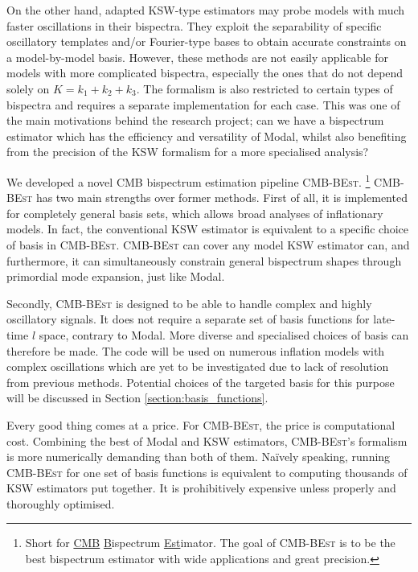 On the other hand, adapted KSW-type estimators \cite{Munchmeyer2014,Munchmeyer2015resonance,Meerburg2016jointResonance} may probe models with much faster oscillations in their bispectra. They exploit the separability of specific oscillatory templates and/or Fourier-type bases to obtain accurate constraints on a model-by-model basis. However, these methods are not easily applicable for models with more complicated bispectra, especially the ones that do not depend solely on $K=k_1+k_2+k_3$. The formalism is also restricted to certain types of bispectra and requires a separate implementation for each case. This was one of the main motivations behind the research project; can we have a bispectrum estimator which has the efficiency and versatility of Modal, whilst also benefiting from the precision of the KSW formalism for a more specialised analysis?

We developed a novel CMB bispectrum estimation pipeline \textsc{CMB-BEst}. \footnote{Short for \underline{CMB} \underline{B}ispectrum \underline{Est}imator. The goal of \textsc{CMB-BEst} is to be the best bispectrum estimator with wide applications and great precision.} \textsc{CMB-BEst} has two main strengths over former methods. First of all, it is implemented for completely general basis sets, which allows broad analyses of inflationary models. In fact, the conventional KSW estimator is equivalent to a specific choice of basis in \textsc{CMB-BEst}. \textsc{CMB-BEst} can cover any model KSW estimator can, and furthermore, it can simultaneously constrain general bispectrum shapes through primordial mode expansion, just like Modal.

Secondly, \textsc{CMB-BEst} is designed to be able to handle complex and highly oscillatory signals. It does not require a separate set of basis functions for late-time $l$ space, contrary to Modal. More diverse and specialised choices of basis can therefore be made. The code will be used on numerous inflation models with complex oscillations which are yet to be investigated due to lack of resolution from previous methods. Potential choices of the targeted basis for this purpose will be discussed in Section \ref{section:basis_functions}.

Every good thing comes at a price. For \textsc{CMB-BEst}, the price is computational cost. Combining the best of Modal and KSW estimators, \textsc{CMB-BEst}'s formalism is more numerically demanding than both of them. Na\"ively speaking, running \textsc{CMB-BEst} for one set of basis functions is equivalent to computing thousands of KSW estimators put together. It is prohibitively expensive unless properly and thoroughly optimised.

